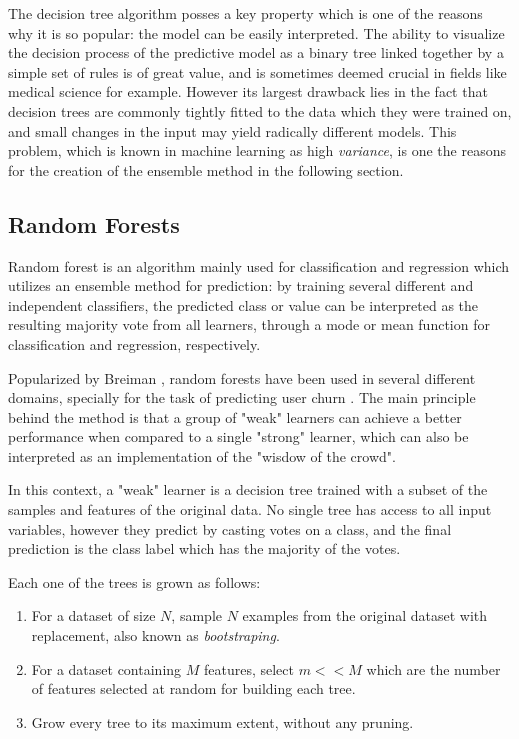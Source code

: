 \documentclass{kththesis}
\begin{document}
The decision tree algorithm posses a key property which is one of the reasons why it is so popular: the model can be easily interpreted. The ability to visualize the decision process of the predictive model as a binary tree linked together by a simple set of rules is of great value, and is sometimes deemed crucial in fields like medical science for example. However its largest drawback lies in the fact that decision trees are commonly tightly fitted to the data which they were trained on, and small changes in the input may yield radically different models. This problem, which is known in machine learning as high \emph{variance}, is one the reasons for the creation of the ensemble method in the following section.
 
\subsection{Random Forests}

Random forest is an algorithm mainly used for classification and regression which utilizes an ensemble method for prediction: by training several different and independent classifiers, the predicted class or value can be interpreted as the resulting majority vote from all learners, through a mode or mean function for classification and regression, respectively.

Popularized by Breiman \citep{breiman2001random}, random forests have been used in several different domains, specially for the task of predicting user churn \citep{coussement2013customer} \citep{burez2008separating}. The main principle behind the method is that a group of "weak" learners can achieve a better performance when compared to a single "strong" learner, which can also be interpreted as an implementation of the "wisdow of the crowd". 

In this context, a "weak" learner is a decision tree trained with a subset of the samples and features of the original data. No single tree has access to all input variables, however they predict by casting votes on a class, and the final prediction is the class label which has the majority of the votes.

Each one of the trees is grown as follows:

\begin{enumerate}
\item For a dataset of size $N$, sample $N$ examples from the original dataset with replacement, also known as \emph{bootstraping}.
\item For a dataset containing $M$ features, select $m<<M$ which are the number of features selected at random for building each tree.
\item Grow every tree to its maximum extent, without any pruning.
\end{enumerate}
\end{document}
